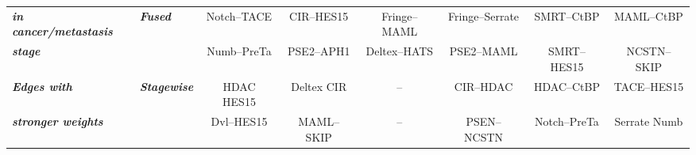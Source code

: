 \documentclass[10pt]{article}
\begin{document}
\begin{table}
\begin{tabular}{|llcccccc|}
\multicolumn{1}{|l|}{\textit{\textbf{in cancer/metastasis}}} & \multicolumn{1}{l|}{\textit{\textbf{Fused}}}     & \multicolumn{1}{c|}{Notch--TACE}                                                                 & \multicolumn{1}{c|}{CIR--HES15}   & \multicolumn{1}{c|}{Fringe--MAML}                                                               & \multicolumn{1}{c|}{Fringe--Serrate}                                                               & \multicolumn{1}{c|}{SMRT--CtBP}                                                                                  & MAML--CtBP                                                                                \\ \cline{3-8}
\multicolumn{1}{|l|}{\textit{\textbf{stage}}}                & \multicolumn{1}{l|}{\textit{\textbf{}}}          & \multicolumn{1}{c|}{Numb--PreTa}                                                                 & \multicolumn{1}{c|}{PSE2--APH1}   & \multicolumn{1}{c|}{Deltex--HATS}                                                               & \multicolumn{1}{c|}{PSE2--MAML}                                                                    & \multicolumn{1}{c|}{SMRT--HES15}                                                                                 & NCSTN--SKIP                                                                                \\ \hline
\multicolumn{1}{|l|}{\textit{\textbf{Edges with}}}           & \multicolumn{1}{l|}{\textit{\textbf{Stagewise}}} & \multicolumn{1}{c|}{HDAC HES15}                                                                 & \multicolumn{1}{c|}{Deltex CIR}  & \multicolumn{1}{c|}{--}                                                                            & \multicolumn{1}{c|}{CIR--HDAC}                                                                     & \multicolumn{1}{c|}{HDAC--CtBP}                                                                                  & TACE--HES15                                                                               \\ \cline{3-8}
\multicolumn{1}{|l|}{\textit{\textbf{stronger weights}}}     & \multicolumn{1}{l|}{\textit{\textbf{}}}          & \multicolumn{1}{c|}{Dvl--HES15}                                                                  & \multicolumn{1}{c|}{MAML--SKIP}    & \multicolumn{1}{c|}{--}                                                                            & \multicolumn{1}{c|}{PSEN--NCSTN}                                                                   & \multicolumn{1}{c|}{Notch--PreTa}                                                                                & Serrate Numb                                                                             \\ \cline{2-8}

\end{tabular}
\end{table}
\end{document}

